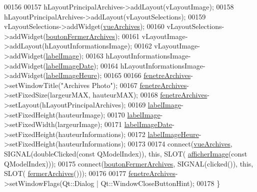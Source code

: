 \begin{DoxyCode}
00156 
00157     hLayoutPrincipalArchives->addLayout(vLayoutImage);
00158     hLayoutPrincipalArchives->addLayout(vLayoutSelections);
00159     vLayoutSelections->addWidget(\hyperlink{class_archives_a28fe566dcac396079d064460b17293b9}{vueArchives});
00160     vLayoutSelections->addWidget(\hyperlink{class_archives_a598e607e203aee9386f85d55f20d8fda}{boutonFermerArchives});
00161     vLayoutImage->addLayout(hLayoutInformationsImage);
00162     vLayoutImage->addWidget(\hyperlink{class_archives_af311679d957985d956a4ee5ad28a5988}{labelImage});
00163     hLayoutInformationsImage->addWidget(\hyperlink{class_archives_accb81477f1edca94691ae630ddc1f3f9}{labelImageDate});
00164     hLayoutInformationsImage->addWidget(\hyperlink{class_archives_ab678af24ff4c67b8791ab52e998c79cb}{labelImageHeure});
00165 
00166     \hyperlink{class_archives_ad7c8209637b01f638b64530020d18b8e}{fenetreArchives}->setWindowTitle(\textcolor{stringliteral}{"Archives Photo"});
00167     \hyperlink{class_archives_ad7c8209637b01f638b64530020d18b8e}{fenetreArchives}->setFixedSize(largeurMAX, hauteurMAX);
00168     \hyperlink{class_archives_ad7c8209637b01f638b64530020d18b8e}{fenetreArchives}->setLayout(hLayoutPrincipalArchives);
00169     \hyperlink{class_archives_af311679d957985d956a4ee5ad28a5988}{labelImage}->setFixedHeight(hauteurImage);
00170     \hyperlink{class_archives_af311679d957985d956a4ee5ad28a5988}{labelImage}->setFixedWidth(largeurImage);
00171     \hyperlink{class_archives_accb81477f1edca94691ae630ddc1f3f9}{labelImageDate}->setFixedHeight(hauteurInformations);
00172     \hyperlink{class_archives_ab678af24ff4c67b8791ab52e998c79cb}{labelImageHeure}->setFixedHeight(hauteurInformations);
00173 
00174     connect(\hyperlink{class_archives_a28fe566dcac396079d064460b17293b9}{vueArchives}, SIGNAL(doubleClicked(\textcolor{keyword}{const} QModelIndex)), \textcolor{keyword}{this}, SLOT(
      \hyperlink{class_archives_a0e12a12774643d96831be4daba73976e}{afficherImage}(\textcolor{keyword}{const} QModelIndex)));
00175     connect(\hyperlink{class_archives_a598e607e203aee9386f85d55f20d8fda}{boutonFermerArchives}, SIGNAL(clicked()), \textcolor{keyword}{this}, SLOT(
      \hyperlink{class_archives_a0001d8b6a783f1f424965832e89a1f6f}{fermerArchives}()));
00176 
00177     \hyperlink{class_archives_ad7c8209637b01f638b64530020d18b8e}{fenetreArchives}->setWindowFlags(Qt::Dialog | Qt::WindowCloseButtonHint);
00178 \}
\end{DoxyCode}
\mbox{\label{class_archives_a14d4f834ea05cf421161336607b4bb31}} 
